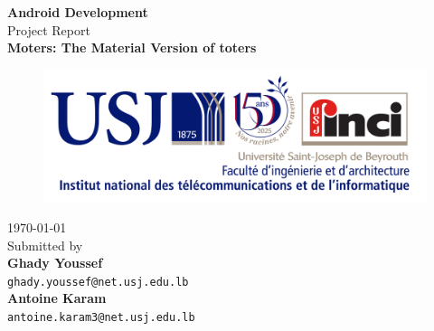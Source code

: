 \begin{titlepage}

    \vspace*{\fill}
    \begin{center}
        \textup{\large\textbf{Android Development}\\
            \small{Project Report}}\\[0.3in]

        \Large \textbf {Moters: The Material Version of toters}\\[0.3in]

        \begin{figure}[h]
            \centering
            \includegraphics[width=0.65\linewidth]{assets/inci.png}
        \end{figure}

        \vspace{.5in}

        \normalsize\today\\
        Submitted by \\[0.2in]

        \textbf{Ghady Youssef}\\
        \texttt{ghady.youssef@net.usj.edu.lb}\\
        \vspace{.3in}
        \textbf{Antoine Karam}\\
        \texttt{antoine.karam3@net.usj.edu.lb}\\
    \end{center}
    \vspace*{\fill}

\end{titlepage}
